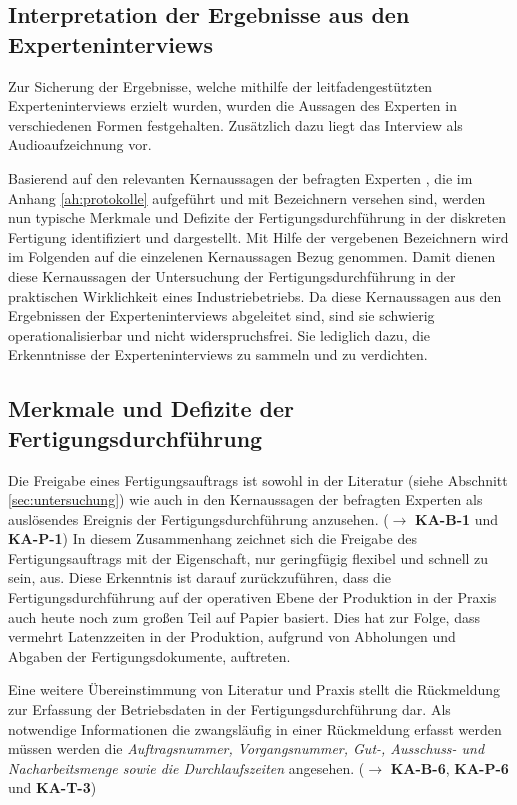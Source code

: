 \subsection{Interpretation der Ergebnisse aus den Experteninterviews}
Zur Sicherung der Ergebnisse, welche mithilfe der leitfadengestützten Experteninterviews erzielt wurden, wurden die Aussagen des Experten in verschiedenen Formen festgehalten. Zusätzlich dazu liegt das Interview als Audioaufzeichnung vor. 

Basierend auf den relevanten Kernaussagen der befragten Experten , die im Anhang \ref{ah:protokolle} aufgeführt und mit Bezeichnern versehen sind, werden nun typische Merkmale und Defizite der Fertigungsdurchführung in der diskreten Fertigung identifiziert und dargestellt. 
Mit Hilfe der vergebenen Bezeichnern wird im Folgenden auf die einzelenen Kernaussagen Bezug genommen.
Damit dienen diese Kernaussagen der Untersuchung der Fertigungsdurchführung in der praktischen Wirklichkeit eines Industriebetriebs.
Da diese Kernaussagen aus den Ergebnissen der Experteninterviews abgeleitet sind, sind sie schwierig operationalisierbar und nicht widerspruchsfrei.  
Sie lediglich dazu, die Erkenntnisse der Experteninterviews zu sammeln und zu verdichten.


\subsection{Merkmale und Defizite der Fertigungsdurchführung}
Die Freigabe eines Fertigungsauftrags ist sowohl in der Literatur (siehe Abschnitt \ref{sec:untersuchung}) wie auch in den Kernaussagen der befragten Experten als auslösendes Ereignis der Fertigungsdurchführung anzusehen. ($\rightarrow$ \textbf{KA-B-1} und \textbf{KA-P-1})  
In diesem Zusammenhang zeichnet sich die Freigabe des Fertigungsauftrags mit der Eigenschaft, nur geringfügig flexibel und schnell zu sein, aus. Diese Erkenntnis ist darauf zurückzuführen, dass die Fertigungsdurchführung auf der operativen Ebene der Produktion in der Praxis auch heute noch zum großen Teil auf Papier basiert. Dies hat zur Folge, dass vermehrt Latenzzeiten in der Produktion, aufgrund von Abholungen und Abgaben der Fertigungsdokumente, auftreten. 

Eine weitere Übereinstimmung von Literatur und Praxis stellt die Rückmeldung zur Erfassung der Betriebsdaten in der Fertigungsdurchführung dar. Als notwendige Informationen die zwangsläufig in einer Rückmeldung erfasst werden müssen werden die \textit{Auftragsnummer, Vorgangsnummer, Gut-, Ausschuss- und Nacharbeitsmenge sowie die Durchlaufszeiten} angesehen.
($\rightarrow$ \textbf{KA-B-6}, \textbf{KA-P-6} und \textbf{KA-T-3})  


